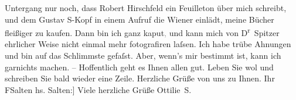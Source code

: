 \begin{ledgroupsized}[t]{13cm}
               Untergang nur noch, dass Robert Hirschfeld ein
               Feuilleton über mich schreibt, und dem Gustav
                  S-Kopf in einem Aufruf die Wiener einlädt,
               meine Bücher fleißiger zu kaufen. Dann bin ich ganz kaput\textcolor{gray}{,} und
               kann mich von D\textsuperscript{r} Spitzer ehrlicher Weise nicht einmal mehr fotografiren laſsen. Ich habe
               trübe Ahnungen und bin auf das Schlimmste gefaſst. Aber, wenn’s mir bestimmt ist,
               kann ich garnichts machen. – Hoffentlich geht es Ihnen allen gut. \pend
           \pstart
           Leben Sie wol und schreiben Sie bald wieder eine Zeile. Herzliche Grüße von uns zu
               Ihnen.\pend
           \pstart Ihr \spacefill\mbox{FSalten}\pend{}\pstart
           \noindent{}{[}hs. Salten:{]} Viele herzliche Grüße\pend
           \pstart \spacefill\mbox{Ottilie S.}\pend{}
         
         \endnumbering{}\end{ledgroupsized}\begin{anhang}\end{anhang}\newcommand{\dateiname}{L03489}\newcommand{\titel}{Felix und Ottilie Salten an Arthur Schnitzler, 3. 8. 1907}\newcommand{\editorInnen}{Martin Anton Müller und Laura Untner}
      